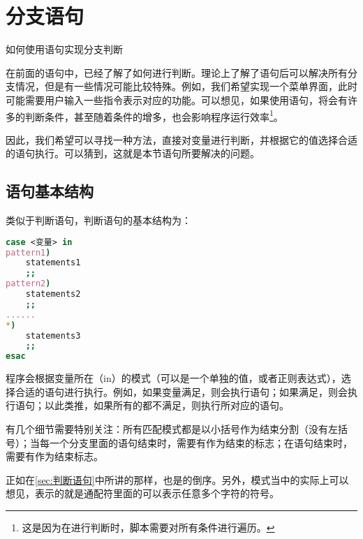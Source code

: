 \section{分支语句}\label{sec:case分支语句}

\begin{Abstract}
    \item 如何使用语句实现分支判断
\end{Abstract}

在前面的语句中，已经了解了如何进行判断。理论上了解了语句后可以解决所有分支情况，但是有一些情况可能比较特殊。例如，我们希望实现一个菜单界面，此时可能需要用户输入一些指令表示对应的功能。可以想见，如果使用语句，将会有许多的判断条件，甚至随着条件的增多，也会影响程序运行效率\footnote{这是因为在进行判断时，脚本需要对所有条件进行遍历。}。

因此，我们希望可以寻找一种方法，直接对变量进行判断，并根据它的值选择合适的语句执行。可以猜到，这就是本节语句所要解决的问题。

\subsection{语句基本结构}\label{subsec:case分支语句-case语句基本结构}

类似于判断语句，判断语句的基本结构为：

\begin{lstlisting}[language=bash]
case <变量> in
pattern1)
    statements1
    ;;
pattern2)
    statements2
    ;;
......
*)
    statements3
    ;;
esac
\end{lstlisting}

程序会根据变量所在（in）的模式（可以是一个单独的值，或者正则表达式），选择合适的语句进行执行。例如，如果变量满足，则会执行语句；如果满足，则会执行语句；以此类推，如果所有的都不满足，则执行\code{*}所对应的语句。

\begin{attention}
    有几个细节需要特别关注：所有匹配模式都是以小括号作为结束分割（没有左括号）；当每一个分支里面的语句结束时，需要有\code{;;}作为结束的标志；在语句结束时，需要有作为结束标志。
\end{attention}

\begin{extend}
    正如在\ref{sec:判断语句}中所讲的那样，也是的倒序。另外，模式当中的\code{*}实际上可以想见，表示的就是通配符里面的可以表示任意多个字符的\code{*}符号。
\end{extend}

